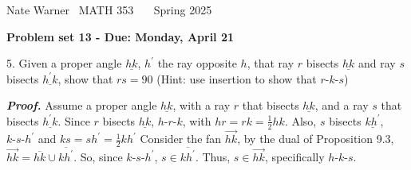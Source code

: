 \documentclass{report}
\title{\Huge{}}
\author{\huge{Nathan Warner}}
\date{\huge{}}
\begin{document}
    \pagebreak \bigbreak \noindent
    Nate Warner \ \quad \quad \quad \quad \quad \quad \quad \quad \quad \quad \quad \quad \quad \quad \quad \quad  MATH 353 \quad  \quad \quad \quad \quad \quad \quad \quad \quad \ \ \quad \quad \quad \quad \ \quad Spring 2025
    \begin{center}
        \textbf{Problem set 13 - Due: Monday, April 21}
    \end{center}
    \bigbreak \noindent 
    \begin{mdframed}
        5. Given a proper angle $\underline{hk}$, $h^{\prime}$ the ray opposite $h$, that ray $r$ bisects $\underline{hk}$ and ray $s$ bisects $\underline{h^{\prime}k}$, show that $rs = 90$ (Hint: use insertion to show that $ r\text{-}k\text{-}s$)
    \end{mdframed}
    \bigbreak \noindent 
    \textbf{\textit{Proof.}} Assume a proper angle $\underline{hk}$, with a ray $r$ that bisects $ \underline{hk}$, and a ray $s$ that bisects $ \underline{h^{\prime}k} $. Since $r$ bisects $\underline{hk}$, $ h\text{-}r\text{-}k$, with $ hr = rk = \frac{1}{2}hk$. Also, $s$ bisects $ \underline{kh^{\prime}}$, $ k\text{-}s\text{-}h^{\prime}$ and $ks = sh^{\prime} = \frac{1}{2}kh^{\prime}$
    \bigbreak \noindent 
    Consider the fan $\overrightarrow{hk}$, by the dual of Proposition 9.3, $\overrightarrow{hk} = \overline{hk} \cup \overline{kh^{\prime}}$. So, since $ k\text{-}s\text{-}h^{\prime}$, $ s \in \overline{kh^{\prime}}$. Thus, $s\in \overrightarrow{hk}$, specifically $ h\text{-}k\text{-}s$.
\end{document}

